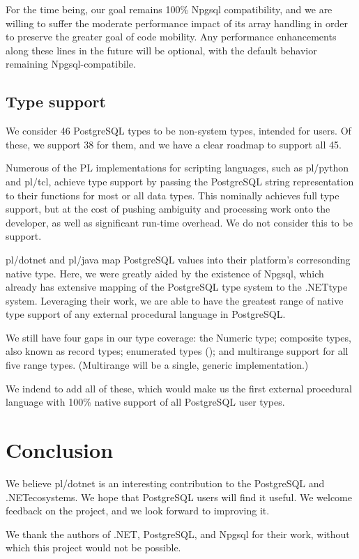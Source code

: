 \documentclass[sigconf,techreport,authorversion,nonacm]{acmart}
\newcommand{\dotnet}{.NET}
\begin{document}
For the time being, our goal remains 100\% Npgsql compatibility, and
we are willing to suffer the moderate performance impact of its
array handling in order to preserve the greater goal of code mobility.
Any performance enhancements along these lines in the future will
be optional, with the default behavior remaining Npgsql-compatibile.

\subsection{Type support}

We consider 46 PostgreSQL types to be non-system types, intended
for users.  Of these, we support 38 for them, and we have a
clear roadmap to support all 45.

Numerous of the PL implementations for scripting languages, such
as pl/python and pl/tcl, achieve type support by passing the
PostgreSQL string representation to their functions for most or all
data types. This nominally achieves full type support, but at the
cost of pushing ambiguity and processing work onto the developer,
as well as significant run-time overhead. We do not consider this
to be  support.

pl/dotnet and pl/java map PostgreSQL values into their platform's
corresonding native type. Here, we were greatly aided by the
existence of Npgsql, which already has extensive mapping of the
PostgreSQL type system to the \dotnet type system. Leveraging their
work, we are able to have the greatest range of native type support
of any external procedural language in PostgreSQL.

We still have four gaps in our type coverage: the Numeric type;
composite types, also known as record types; enumerated types
(); and multirange support for all five range types.
(Multirange will be a single, generic implementation.)

We indend to add all of these, which would make us the first external
procedural language with 100\% native support of all PostgreSQL
user types.


\section{Conclusion}


We believe pl/dotnet is an interesting contribution to the PostgreSQL
and \dotnet ecosystems. We hope that PostgreSQL users will find it
useful.  We welcome feedback on the project, and we look forward
to improving it.

We thank the authors of \dotnet, PostgreSQL, and Npgsql for their work,
without which this project would not be possible.

\balance





\tableofcontents
\end{document}

